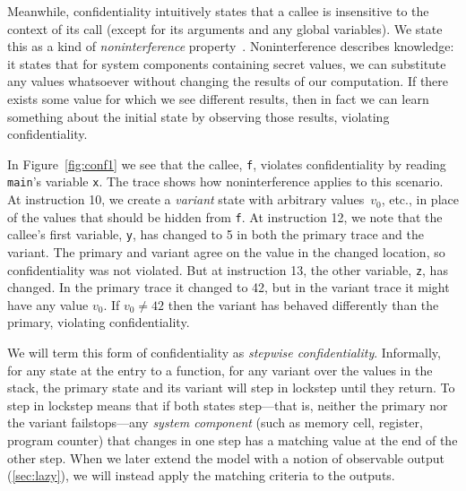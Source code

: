 \documentclass[acmsmall,review,anonymous]{acmart}\settopmatter{printfolios=true,printccs=false,printacmref=false}
\begin{document}
Meanwhile, confidentiality intuitively states that a callee is insensitive to
the context of its call (except for its arguments and any global
variables).
We state this as a kind of {\em noninterference} property~\citep{Goguen1982SecurityPA}.
Noninterference describes knowledge: it states that for system components
containing secret values, we can substitute any values whatsoever without changing the results
of our computation. If there exists some value for which we see different results, then
in fact we can learn something about the initial state by observing those results, violating
confidentiality.

In Figure~\ref{fig:conf1} we see that the callee, {\tt f}, violates confidentiality
by reading {\tt main}'s variable {\tt x}. The trace
shows how noninterference applies to this scenario. At instruction 10, we create a {\em variant}
state with arbitrary values\ifaftersubmission{}\fi~\(v_0\), etc., in place of the values that should
be hidden from {\tt f}. At instruction 12, we note that the callee's first variable, {\tt y}, has
changed to 5 in both the primary trace and the variant. The primary and variant agree on
the value in the changed location, so confidentiality was not violated. But at instruction 13,
the other variable, {\tt z}, has changed. In the primary trace it changed to 42, but
in the variant trace it might have any value \(v_0\). If \(v_0 \neq 42\) then the variant
has behaved differently than the primary, violating confidentiality.

We will term this form of confidentiality as {\em stepwise confidentiality}. Informally,
for any state at the entry to a function, for any variant over the values in the stack,
the primary state and its variant will step in lockstep until they return. To step in lockstep
means that if both states step---that is, neither the primary nor the variant failstops---any
{\em system component} (such as memory cell, register, program counter) that changes
in one step has a matching value at the end of the other step.
When we later extend the model with a notion of observable output (\cref{sec:lazy}),  we will instead apply the matching
criteria to the outputs. 

\end{document}
